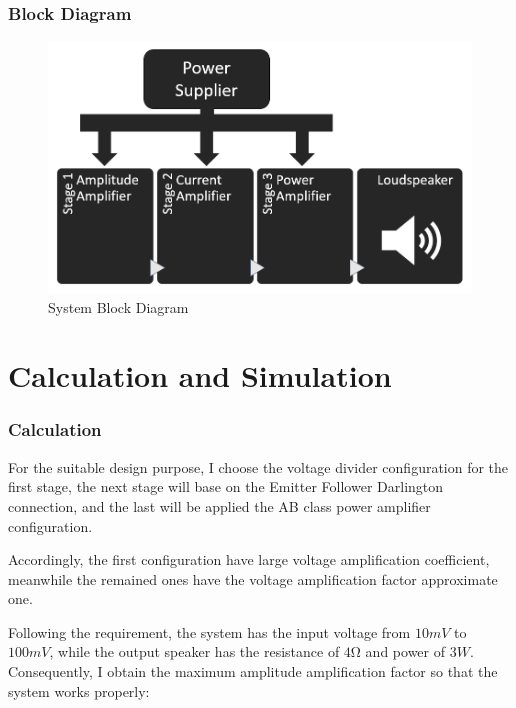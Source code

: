 \documentclass[twoside, a4paper, leqno]{article}
\begin{document}
	\section{Block Diagram}
		\begin{center}
			\begin{figure}[htp]
				\begin{center}
					\includegraphics[scale = .45]{figure/blockdiagram.png}
				\end{center}
				\caption{System Block Diagram}
				\label{refFigure1}
			\end{figure}
		\end{center}
	
	\newpage
	\part{Calculation and Simulation}
	\section{Calculation}
		For the suitable design purpose, I choose the voltage divider configuration for the first stage, the next stage will base on the Emitter Follower Darlington connection, and the last will be applied the AB class power amplifier configuration.
		
		Accordingly, the first configuration have large voltage amplification coefficient, meanwhile the remained ones have the voltage amplification factor approximate one.
		
		Following the requirement, the system has the input voltage from $10mV$ to $100mV$, while the output speaker has the resistance of $4\si{\ohm}$ and power of $3W$. Consequently, I obtain the maximum amplitude amplification factor so that the system works properly:
		
\end{document}
